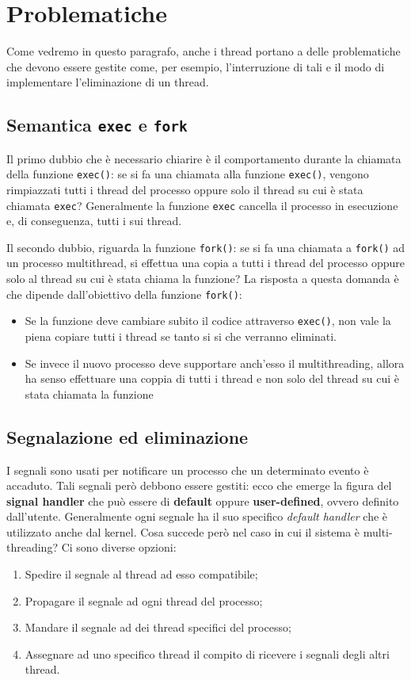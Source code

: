 \section{Problematiche}
Come vedremo in questo paragrafo, anche i thread portano a delle problematiche che devono essere gestite come, per esempio, l'interruzione di tali e il modo di implementare l'eliminazione di un thread.

\subsection{Semantica \texttt{exec} e \texttt{fork}}
Il primo dubbio che è necessario chiarire è il comportamento durante la chiamata della funzione \texttt{exec()}: se si fa una chiamata alla funzione \texttt{exec()}, vengono rimpiazzati tutti i thread del processo oppure solo il thread su cui è stata chiamata \texttt{exec}? Generalmente la funzione \texttt{exec} cancella il processo in esecuzione e, di conseguenza, tutti i sui thread.

Il secondo dubbio, riguarda la funzione \texttt{fork()}: se si fa una chiamata a \texttt{fork()} ad un processo multithread, si effettua una copia a tutti i thread del processo oppure solo al thread su cui è stata chiama la funzione? La risposta a questa domanda è che dipende dall'obiettivo della funzione \texttt{fork()}:
\vspace{-5px}
\begin{itemize}
\setlength{\itemsep}{-.15 em}
    \item Se la funzione deve cambiare subito il codice attraverso \texttt{exec()}, non vale la piena copiare tutti i thread se tanto si si che verranno eliminati.
    \item Se invece il nuovo processo deve supportare anch'esso il multithreading, allora ha senso effettuare una coppia di tutti i thread e non solo del thread su cui è stata chiamata la funzione
\end{itemize}
% 
\subsection{Segnalazione ed eliminazione}
I segnali sono usati per notificare un processo che un determinato evento è accaduto. Tali segnali però debbono essere gestiti: ecco che emerge la figura del \textbf{signal handler} che può essere di \textbf{default} oppure \textbf{user-defined}, ovvero definito dall'utente. Generalmente ogni segnale ha il suo specifico \textit{default handler} che è utilizzato anche dal kernel. Cosa succede però nel caso in cui il sistema è multi-threading? Ci sono diverse opzioni:
\vspace{-5px}
\begin{enumerate}
\setlength{\itemsep}{-.15 em}
    \item Spedire il segnale al thread ad esso compatibile;
    \item Propagare il segnale ad ogni thread del processo;
    \item Mandare il segnale ad dei thread specifici del processo;
    \item Assegnare ad uno specifico thread il compito di ricevere i segnali degli altri thread.
\end{enumerate}


